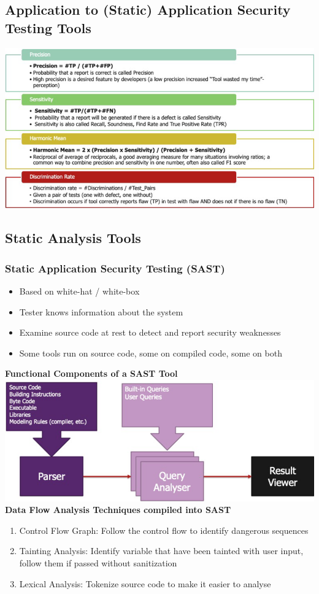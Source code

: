 \subsection{Application to (Static) Application Security Testing Tools}
\includegraphics[width=\linewidth]{../img/application.png}

\subsection{Static Analysis Tools}
\subsubsection{Static Application Security Testing (SAST)}
\begin{itemize}
    \item Based on white-hat / white-box
    \item Tester knows information about the system
    \item Examine source code at rest to detect and report security weaknesses
    \item Some tools run on source code, some on compiled code, some on both
\end{itemize}
\textbf{Functional Components of a SAST Tool}\\
\includegraphics[width=\linewidth]{../img/sast_tool.png}\\
\textbf{Data Flow Analysis Techniques compiled into SAST}
\begin{enumerate}
    \item Control Flow Graph: Follow the control flow to identify dangerous sequences
    \item Tainting Analysis: Identify variable that have been tainted with user input, follow them if passed without sanitization
    \item Lexical Analysis: Tokenize source code to make it easier to analyse
\end{enumerate}


